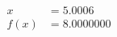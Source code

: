 \documentclass[preview]{standalone}
\begin{document}
\begin{align*}
x &= 5.0006\\f(x) &= 8.0000000
\end{align*}
\end{document}
